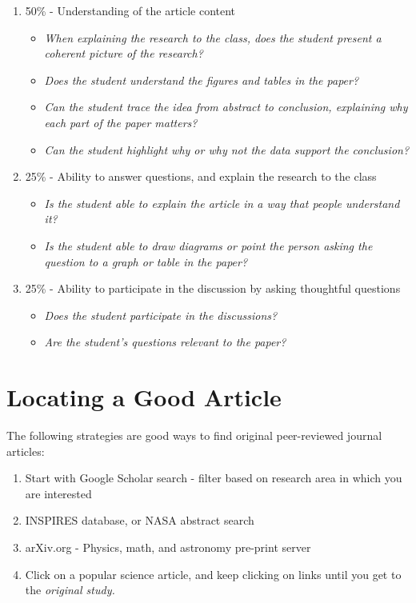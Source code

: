 \documentclass[12pt]{article}
\begin{document}
\begin{enumerate}
\item 50\% - Understanding of the article content
\begin{itemize}
\item \textit{When explaining the research to the class, does the student present a coherent picture of the research?}
\item \textit{Does the student understand the figures and tables in the paper?}
\item \textit{Can the student trace the idea from abstract to conclusion, explaining why each part of the paper matters?}
\item \textit{Can the student highlight why or why not the data support the conclusion?}
\end{itemize}
\item 25\% - Ability to answer questions, and explain the research to the class
\begin{itemize}
\item \textit{Is the student able to explain the article in a way that people understand it?}
\item \textit{Is the student able to draw diagrams or point the person asking the question to a graph or table in the paper?}
\end{itemize}
\item 25\% - Ability to participate in the discussion by asking thoughtful questions
\begin{itemize}
\item \textit{Does the student participate in the discussions?}
\item \textit{Are the student's questions relevant to the paper?}
\end{itemize}
\end{enumerate}

\section{Locating a Good Article}

The following strategies are good ways to find original peer-reviewed journal articles:

\begin{enumerate}
\item Start with Google Scholar search - filter based on research area in which you are interested
\item INSPIRES database, or NASA abstract search
\item arXiv.org - Physics, math, and astronomy pre-print server
\item Click on a popular science article, and keep clicking on links until you get to the \textit{original study.}
\end{enumerate}
\end{document}
